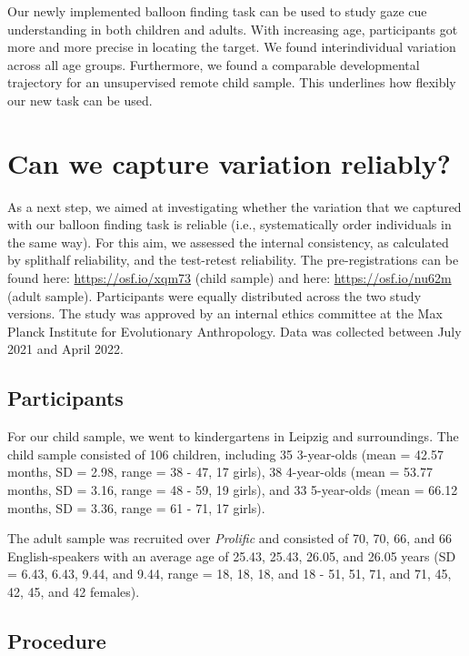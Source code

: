 \documentclass[
  man,floatsintext]{apa6}
\begin{document}
Our newly implemented balloon finding task can be used to study gaze cue understanding in both children and adults. With increasing age, participants got more and more precise in locating the target. We found interindividual variation across all age groups. Furthermore, we found a comparable developmental trajectory for an unsupervised remote child sample. This underlines how flexibly our new task can be used.

\hypertarget{can-we-capture-variation-reliably}{%
\section{Can we capture variation reliably?}\label{can-we-capture-variation-reliably}}

As a next step, we aimed at investigating whether the variation that we captured with our balloon finding task is reliable (i.e.,
systematically order individuals in the same way). For this aim, we assessed the internal consistency, as calculated by splithalf reliability, and the test-retest reliability. The pre-registrations can be found here: \url{https://osf.io/xqm73} (child sample) and here: \url{https://osf.io/nu62m} (adult sample). Participants were equally distributed across the two study versions. The study was approved by an internal ethics committee at the Max Planck Institute for Evolutionary Anthropology. Data was collected between July 2021 and April 2022.

\hypertarget{participants-1}{%
\subsection{Participants}\label{participants-1}}

For our child sample, we went to kindergartens in Leipzig and surroundings.
The child sample consisted of
106 children, including
35 3-year-olds
(mean = 42.57 months,
SD = 2.98,
range = 38
- 47,
17 girls),
38 4-year-olds
(mean = 53.77 months,
SD = 3.16,
range = 48
- 59,
19 girls),
and 33 5-year-olds
(mean = 66.12 months,
SD = 3.36,
range = 61
- 71,
17 girls).

The adult sample was recruited over \emph{Prolific} and consisted of 70, 70, 66, and 66 English-speakers with an average age of 25.43, 25.43, 26.05, and 26.05 years (SD = 6.43, 6.43, 9.44, and 9.44, range = 18, 18, 18, and 18 - 51, 51, 71, and 71, 45, 42, 45, and 42 females).

\hypertarget{procedure-1}{%
\subsection{Procedure}\label{procedure-1}}
\end{document}
